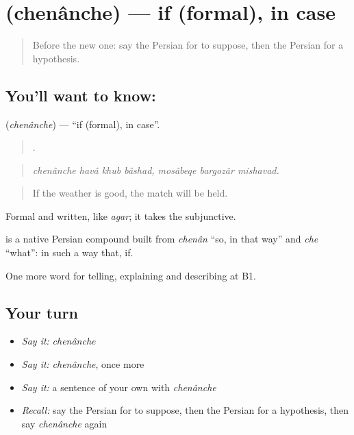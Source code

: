 \section[\texorpdfstring{\fa{چنانچه} (chenânche)}{چنانچه (chenânche)}]{ (chenânche) — if (formal), in case}

\label{lesson:FA-C391-chenanche}



\begin{quote}
Before the new one: say the Persian for to suppose, then the Persian for a hypothesis.
\end{quote}

\subsection*{You'll want to know: }
\textbf{} (\emph{chenânche}) — \textquotedblleft{}if (formal), in case\textquotedblright{}.

\begin{quote}
      .
\end{quote}

\begin{quote}
\emph{chenânche havâ khub bâshad, mosâbeqe bargozâr mishavad.}
\end{quote}

\begin{quote}
If the weather is good, the match will be held.
\end{quote}

Formal and written, like \emph{agar}; it takes the subjunctive.

\begin{cousinweb}
\textbf{} is a native Persian compound built from \emph{chenân} \textquotedblleft{}so, in that way\textquotedblright{} and \emph{che} \textquotedblleft{}what\textquotedblright{}: in such a way that, if.
\end{cousinweb}

\begin{grammarlens}[title={What you've built}]
One more word for telling, explaining and describing at B1.
\end{grammarlens}

\subsection*{Your turn}
\begin{itemize}
\raggedright
  \item \emph{Say it:} \emph{chenânche}
  \item \emph{Say it:} \emph{chenânche}, once more
  \item \emph{Say it:} a sentence of your own with \emph{chenânche}
  \item \emph{Recall:} say the Persian for to suppose, then the Persian for a hypothesis, then say \emph{chenânche} again
\end{itemize}

